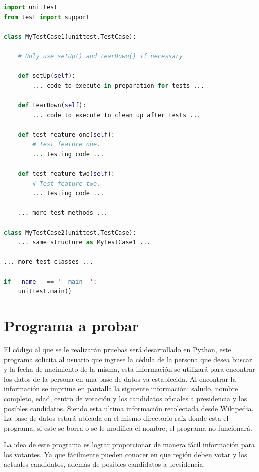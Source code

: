 \documentclass[conference]{IEEEtran}
\begin{document}
\begin{lstlisting}[language=Python, breaklines=true,
    postbreak=\mbox{\textcolor{red}{$\hookrightarrow$}\space}]
import unittest
from test import support

class MyTestCase1(unittest.TestCase):

    # Only use setUp() and tearDown() if necessary

    def setUp(self):
        ... code to execute in preparation for tests ...

    def tearDown(self):
        ... code to execute to clean up after tests ...

    def test_feature_one(self):
        # Test feature one.
        ... testing code ...

    def test_feature_two(self):
        # Test feature two.
        ... testing code ...

    ... more test methods ...

class MyTestCase2(unittest.TestCase):
    ... same structure as MyTestCase1 ...

... more test classes ...

if __name__ == '__main__':
    unittest.main()

\end{lstlisting}


\section{Programa a probar}

El código al que se le realizarán pruebas será desarrollado en Python, este programa solicita al usuario que ingrese la cédula de la persona que desea buscar y la fecha de nacimiento de la misma, esta información se utilizará para encontrar los datos de la persona en una base de datos ya establecida. Al encontrar la información se imprime en pantalla la siguiente información: saludo, nombre completo, edad, centro de votación y los candidatos oficiales a presidencia y los posibles candidatos. Siendo esta ultima información recolectada desde Wikipedia. La base de datos estará ubicada en el mismo directorio raíz donde esta el programa, si este se borra o se le modifica el nombre, el programa no funcionará.

La idea de este programa es lograr proporcionar de manera fácil información para los votantes. Ya que fácilmente pueden conocer en que región deben votar y los actuales candidatos, además de posibles candidatos a presidencia.
\end{document}
